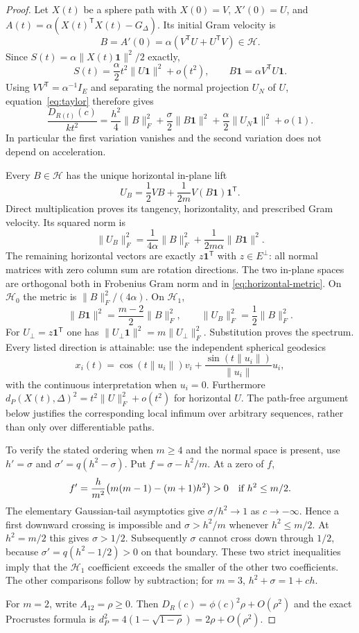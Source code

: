 \documentclass[11pt]{article}
\theoremstyle{remark}\newtheorem{remark}[theorem]{Remark}
\newcommand{\one}{\mathbf 1}
\begin{document}
\begin{proof}
Let $X(t)$ be a sphere path with $X(0)=V$, $X'(0)=U$, and
$A(t)=\alpha(X(t)^{\mathsf T}X(t)-G_\Delta)$.  Its initial Gram velocity is
\[
 B=A'(0)=\alpha(V^{\mathsf T}U+U^{\mathsf T}V)\in\mathcal H.
\]
Since $S(t)=\alpha\|X(t)\one\|^2/2$ exactly,
\[
 S(t)=\frac\alpha2t^2\|U\one\|^2+o(t^2),\qquad
 B\one=\alpha V^{\mathsf T}U\one.
\]
Using $VV^{\mathsf T}=\alpha^{-1}I_E$ and separating the normal projection
$U_N$ of $U$, equation~\eqref{eq:taylor} therefore gives
\begin{equation}\label{eq:intrinsic-quadratic}
 \frac{D_{R(t)}(c)}{kt^2}
 =\frac{h^2}{4}\|B\|_F^2+
   \frac\sigma2\|B\one\|^2+
   \frac\alpha2\|U_N\one\|^2+o(1).
\end{equation}
In particular the first variation vanishes and the second variation does
not depend on acceleration.

Every $B\in\mathcal H$ has the unique horizontal in-plane lift
\[
 U_B=\frac12VB+\frac1{2m}V(B\one)\one^{\mathsf T}.
\]
Direct multiplication proves its tangency, horizontality, and prescribed
Gram velocity.  Its squared norm is
\begin{equation}\label{eq:horizontal-metric}
 \|U_B\|_F^2
 =\frac1{4\alpha}\|B\|_F^2+
   \frac1{2m\alpha}\|B\one\|^2.
\end{equation}
The remaining horizontal vectors are exactly $z\one^{\mathsf T}$ with
$z\in E^\perp$: all normal matrices with zero column sum are rotation
directions.  The two in-plane spaces are orthogonal both in Frobenius
Gram norm and in \eqref{eq:horizontal-metric}.  On $\mathcal H_0$ the
metric is $\|B\|_F^2/(4\alpha)$.  On $\mathcal H_1$,
\[
 \|B\one\|^2=\frac{m-2}{2}\|B\|_F^2,\qquad
 \|U_B\|_F^2=\frac12\|B\|_F^2.
\]
For $U_\perp=z\one^{\mathsf T}$ one has
$\|U_\perp\one\|^2=m\|U_\perp\|_F^2$.
Substitution proves the spectrum.  Every listed direction is attainable:
use the independent spherical geodesics
\[
 x_i(t)=\cos(t\|u_i\|)v_i+
       \frac{\sin(t\|u_i\|)}{\|u_i\|}u_i,
\]
with the continuous interpretation when $u_i=0$.  Furthermore
$d_P(X(t),\Delta)^2=t^2\|U\|_F^2+o(t^2)$ for horizontal $U$.
The path-free argument below justifies the corresponding local infimum
over arbitrary sequences, rather than only over differentiable paths.

To verify the stated ordering when $m\ge4$ and the normal space is
present, use $h'=\sigma$ and $\sigma'=q(h^2-\sigma)$.  Put
$f=\sigma-h^2/m$.  At a zero of $f$,
\[
 f'=\frac{h}{m^2}\bigl(m(m-1)-(m+1)h^2\bigr)>0
 \quad\hbox{if }h^2\le m/2.
\]
The elementary Gaussian-tail asymptotics give $\sigma/h^2\to1$ as
$c\to-\infty$.  Hence a first downward crossing is impossible and
$\sigma>h^2/m$ whenever $h^2\le m/2$.  At $h^2=m/2$ this gives
$\sigma>1/2$.  Subsequently $\sigma$ cannot cross down through $1/2$,
because $\sigma'=q(h^2-1/2)>0$ on that boundary.  These two strict
inequalities imply that the $\mathcal H_1$ coefficient exceeds the
smaller of the other two coefficients.  The other comparisons follow
by subtraction; for $m=3$, $h^2+\sigma=1+ch$.

For $m=2$, write $A_{12}=\rho\ge0$.  Then
$D_R(c)=\phi(c)^2\rho+O(\rho^2)$ and the exact Procrustes formula is
$d_P^2=4(1-\sqrt{1-\rho})=2\rho+O(\rho^2)$.
\end{proof}
\end{document}
